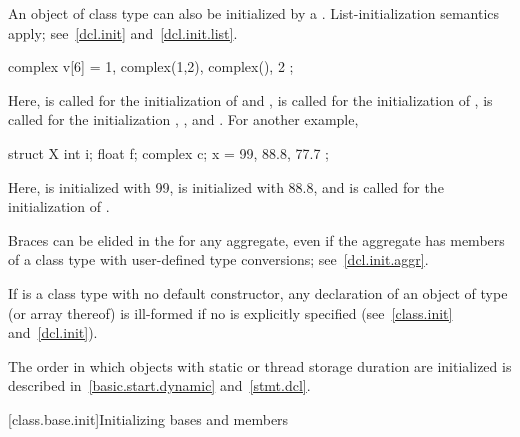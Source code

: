 \pnum
{}%
%
An object of class type can also be initialized by a
. List-initialization semantics apply;
see~\ref{dcl.init} and~\ref{dcl.init.list}.
\begin{example}
\begin{codeblock}
complex v[6] = { 1, complex(1,2), complex(), 2 };
\end{codeblock}

Here,
is called for the initialization of
and
,
is called for the initialization of
,
is called for the initialization
,
,
and
.
For another example,

\begin{codeblock}
struct X {
  int i;
  float f;
  complex c;
} x = { 99, 88.8, 77.7 };
\end{codeblock}

Here,
is initialized with 99,
is initialized with 88.8, and
is called for the initialization of
.
\end{example}
\begin{note}
Braces can be elided in the
for any aggregate, even if the aggregate has members of a class type with
user-defined type conversions; see~\ref{dcl.init.aggr}.
\end{note}

\pnum
\begin{note}
If
is a class type with no default constructor,
any declaration of an object of type
(or array thereof) is ill-formed if no
is explicitly specified (see~\ref{class.init} and~\ref{dcl.init}).
\end{note}

\pnum
\begin{note}
%
The order in which objects with static or thread storage duration
are initialized is described in~\ref{basic.start.dynamic} and~\ref{stmt.dcl}.
\end{note}

[class.base.init]{Initializing bases and members}%
%

